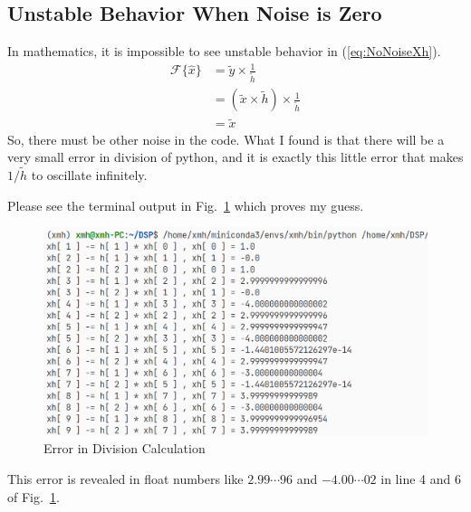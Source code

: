 \documentclass{article}
\begin{document}
\subsection{Unstable Behavior When Noise is Zero}
In mathematics, it is impossible to see unstable behavior in (\ref{eq:NoNoiseXh}).
\begin{equation}
	\begin{aligned}
		\mathcal{F}\{\hat{x}\} &= \tilde{y} \times \frac{1}{\tilde{h}} \\  
		&= ( \tilde{x} \times \tilde{h}) \times \frac{1}{\tilde{h}} \\ 
		&= \tilde{x}
	\end{aligned}
\label{eq:NoNoiseXh}
\end{equation}
So, there must be other noise in the code. What I found is that there will be a very small error in division of python, and it is exactly this little error that makes $1/\tilde{h}$ to oscillate infinitely.

Please see the terminal output in Fig.~\ref{fig:CalculationError} which proves my guess.
\begin{figure}[!h]
	\centering
	\includegraphics[width=3 in]{../pic/CalculationError.png}
	\caption{Error in Division Calculation}
	\label{fig:CalculationError}
\end{figure}

This error is revealed in float numbers like $2.99\cdots96$ and $-4.00\cdots02$ in line 4 and 6 of Fig.~\ref{fig:CalculationError}.
\end{document}
